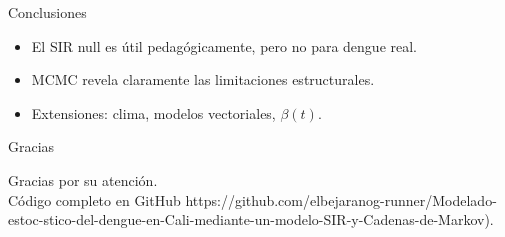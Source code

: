\documentclass{beamer}
\begin{document}
\begin{frame}{Conclusiones}
  \begin{itemize}
    \item El SIR null es útil pedagógicamente, pero no para dengue real.
    \item MCMC revela claramente las limitaciones estructurales.
    \item Extensiones: clima, modelos vectoriales, $\beta(t)$.
  \end{itemize}
\end{frame}

\begin{frame}{Gracias}
  \begin{center}
    \Large Gracias por su atención.
    \\[0.5cm]
    \small Código completo en GitHub https://github.com/elbejaranog-runner/Modelado-estoc-stico-del-dengue-en-Cali-mediante-un-modelo-SIR-y-Cadenas-de-Markov).
  \end{center}
\end{frame}
\end{document}
